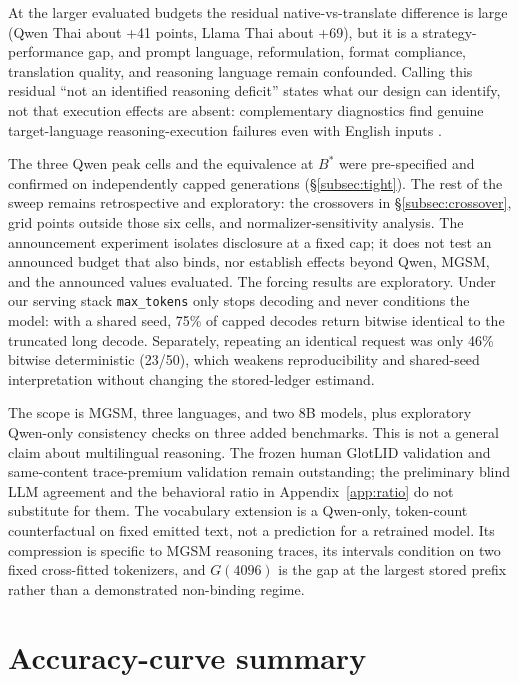 \documentclass[11pt]{article}
\begin{document}
At the larger evaluated budgets the residual native-vs-translate difference is large (Qwen Thai about +41 points, Llama Thai about +69), but it is a strategy-performance gap, and prompt language, reformulation, format compliance, translation quality, and reasoning language remain confounded. Calling this residual ``not an identified reasoning deficit'' states what our design can identify, not that execution effects are absent: complementary diagnostics find genuine target-language reasoning-execution failures even with English inputs \citep{datg}.

The three Qwen peak cells and the equivalence at \(B^*\) were pre-specified and confirmed on independently capped generations (\S\ref{subsec:tight}). The rest of the sweep remains retrospective and exploratory: the crossovers in \S\ref{subsec:crossover}, grid points outside those six cells, and normalizer-sensitivity analysis. The announcement experiment isolates disclosure at a fixed cap; it does not test an announced budget that also binds, nor establish effects beyond Qwen, MGSM, and the announced values evaluated. The forcing results are exploratory. Under our serving stack \texttt{max\_tokens} only stops decoding and never conditions the model: with a shared seed, 75\% of capped decodes return bitwise identical to the truncated long decode. Separately, repeating an identical request was only 46\% bitwise deterministic (23/50), which weakens reproducibility and shared-seed interpretation without changing the stored-ledger estimand.

The scope is MGSM, three languages, and two 8B models, plus exploratory Qwen-only consistency checks on three added benchmarks. This is not a general claim about multilingual reasoning. The frozen human GlotLID validation and same-content trace-premium validation remain outstanding; the preliminary blind LLM agreement and the behavioral ratio in Appendix~\ref{app:ratio} do not substitute for them. The vocabulary extension is a Qwen-only, token-count counterfactual on fixed emitted text, not a prediction for a retrained model. Its compression is specific to MGSM reasoning traces, its intervals condition on two fixed cross-fitted tokenizers, and \(G(4096)\) is the gap at the largest stored prefix rather than a demonstrated non-binding regime.



\appendix

\section{Accuracy-curve summary}
\label{app:curves}
\end{document}
